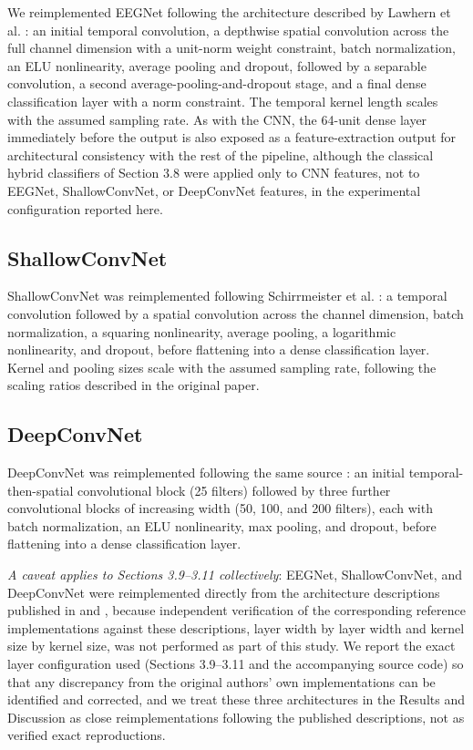 \documentclass[a4paper,fleqn]{cas-sc}
\begin{document}
We reimplemented EEGNet following the architecture described by Lawhern et al. \cite{lawhern2018eegnet}: an initial temporal convolution, a depthwise spatial convolution across the full channel dimension with a unit-norm weight constraint, batch normalization, an ELU nonlinearity, average pooling and dropout, followed by a separable convolution, a second average-pooling-and-dropout stage, and a final dense classification layer with a norm constraint. The temporal kernel length scales with the assumed sampling rate. As with the CNN, the 64-unit dense layer immediately before the output is also exposed as a feature-extraction output for architectural consistency with the rest of the pipeline, although the classical hybrid classifiers of Section 3.8 were applied only to CNN features, not to EEGNet, ShallowConvNet, or DeepConvNet features, in the experimental configuration reported here.



\subsection{ShallowConvNet}

ShallowConvNet was reimplemented following Schirrmeister et al. \cite{schirrmeister2017deep}: a temporal convolution followed by a spatial convolution across the channel dimension, batch normalization, a squaring nonlinearity, average pooling, a logarithmic nonlinearity, and dropout, before flattening into a dense classification layer. Kernel and pooling sizes scale with the assumed sampling rate, following the scaling ratios described in the original paper.



\subsection{DeepConvNet}

DeepConvNet was reimplemented following the same source \cite{schirrmeister2017deep}: an initial temporal-then-spatial convolutional block (25 filters) followed by three further convolutional blocks of increasing width (50, 100, and 200 filters), each with batch normalization, an ELU nonlinearity, max pooling, and dropout, before flattening into a dense classification layer.



\textit{A caveat applies to Sections 3.9--3.11 collectively}: EEGNet, ShallowConvNet, and DeepConvNet were reimplemented directly from the architecture descriptions published in \cite{lawhern2018eegnet} and \cite{schirrmeister2017deep}, because independent verification of the corresponding reference implementations against these descriptions, layer width by layer width and kernel size by kernel size, was not performed as part of this study. We report the exact layer configuration used (Sections 3.9--3.11 and the accompanying source code) so that any discrepancy from the original authors' own implementations can be identified and corrected, and we treat these three architectures in the Results and Discussion as close reimplementations following the published descriptions, not as verified exact reproductions.
\end{document}
